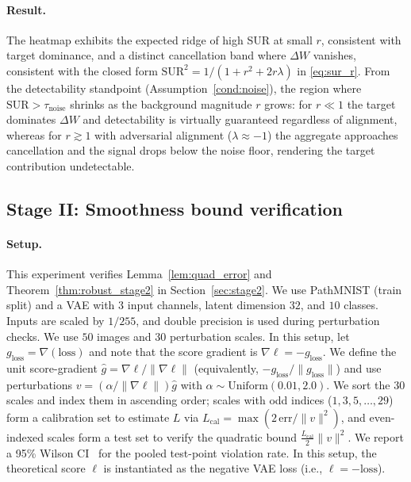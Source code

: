 \documentclass{article}
\theoremstyle{plain}
\theoremstyle{definition}
\theoremstyle{remark}
\numberwithin{theorem}{section}
\numberwithin{definition}{section}
\numberwithin{remark}{section}
\numberwithin{lemma}{section}
\numberwithin{assumption}{section}
\begin{document}
\paragraph{Result.}
The heatmap exhibits the expected ridge of high SUR at small $r$, consistent with target dominance, and a distinct
cancellation band where $\Delta W$ vanishes, consistent with the closed form
$\mathrm{SUR}^2 = 1/(1+r^2+2r\lambda)$ in \eqref{eq:sur_r}.
From the detectability standpoint (Assumption~\ref{cond:noise}), the region where $\mathrm{SUR}>\tau_{\mathrm{noise}}$ shrinks as the background magnitude $r$ grows: for $r\ll 1$ the target dominates $\Delta W$ and detectability is virtually guaranteed regardless of alignment, whereas for $r\gtrsim 1$ with adversarial alignment ($\lambda\approx -1$) the aggregate approaches cancellation and the signal drops below the noise floor, rendering the target contribution undetectable.

\subsection{Stage II: Smoothness bound verification}
\paragraph{Setup.}
This experiment verifies Lemma~\ref{lem:quad_error} and Theorem~\ref{thm:robust_stage2} in Section~\ref{sec:stage2}.
We use PathMNIST (train split) and a VAE with $3$ input channels, latent dimension $32$, and $10$ classes.
Inputs are scaled by $1/255$, and double precision is used during perturbation checks.
We use $50$ images and $30$ perturbation scales. In this setup, let $g_{\text{loss}}=\nabla(\mathrm{loss})$ and note
that the score gradient is $\nabla\ell=-g_{\text{loss}}$. We define the unit score-gradient
$\hat{g}=\nabla\ell/\|\nabla\ell\|$ (equivalently, $-\!g_{\text{loss}}/\|g_{\text{loss}}\|$) and use perturbations
$v=(\alpha/\|\nabla\ell\|)\hat{g}$ with $\alpha\sim\mathrm{Uniform}(0.01,2.0)$.
We sort the 30 scales and index them in ascending order; scales with odd indices ($1,3,5,\ldots,29$) form a calibration set to estimate $L$ via
$L_{\text{cal}}=\max(2\,\mathrm{err}/\|v\|^2)$, and even-indexed scales form a test set to verify the quadratic
bound $\frac{L_{\text{cal}}}{2}\|v\|^2$. We report a 95\% Wilson CI~\cite{wilson1927probable} for the pooled test-point violation rate.
In this setup, the theoretical score $\ell$ is instantiated as the negative VAE loss (i.e., $\ell=-\mathrm{loss}$).
\end{document}
